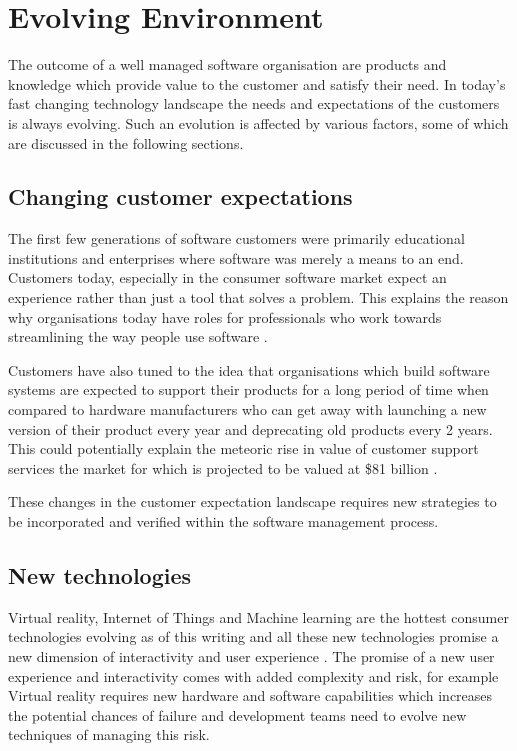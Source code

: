 \section*{Evolving Environment}

The outcome of a well managed software organisation are products and knowledge which provide value to the customer and satisfy their need. In today's fast changing technology landscape the needs and expectations of the customers is always evolving. Such an evolution is affected by various factors, some of which are discussed in the following sections.

\subsection*{Changing customer expectations}

The first few generations of software customers were primarily educational institutions and enterprises where software was merely a means to an end. Customers today, especially in the consumer software market expect an experience rather than just a tool that solves a problem. This explains the reason why organisations today have roles for professionals who work towards streamlining the way people use software \cite{kolko_design_2015} \cite{dixon_stop_2010}.

Customers have also tuned to the idea that organisations which build software systems  are expected to support their products for a long period of time when compared to hardware manufacturers who can get away with launching a new version of their product every year and deprecating old products every 2 years. This could potentially explain the meteoric rise in value of customer support services the market for which is projected to be valued at \$81 billion \cite{wuyts_outsourcing_2015}.

These changes in the customer expectation landscape requires new strategies to be incorporated and verified within the software management process.

\subsection*{New technologies}

Virtual reality, Internet of Things and Machine learning are the hottest consumer technologies evolving as of this writing and all these new technologies promise a new dimension of interactivity and user experience \cite{bachvarov_design-by--customer_2009}. The promise of a new user experience and interactivity comes with added complexity and risk, for example Virtual reality requires new hardware and software capabilities which increases the potential chances of failure and development teams need to evolve new techniques of managing this risk.

